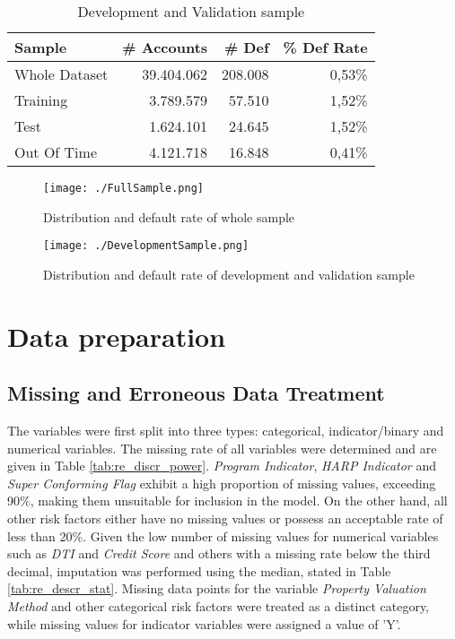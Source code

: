 \begin{table}[H]
\centering
\begin{tabular}{lrrr} \toprule       
\textbf{Sample} & \textbf{\# Accounts} & \textbf{\# Def} & \textbf{\% Def Rate} \\\midrule
Whole Dataset   & 39.404.062           & 208.008         & 0,53\%               \\
Training        & 3.789.579            & 57.510          & 1,52\%               \\
Test            & 1.624.101            & 24.645          & 1,52\%               \\
Out Of Time     & 4.121.718            & 16.848          & 0,41\%               \\\bottomrule
\end{tabular}
\caption{Development and Validation sample}
\label{tab:re_devoofsample}
\end{table}

\begin{figure}[H]
	\centering
	\texttt{[image: ./FullSample.png]}
    \caption{Distribution and default rate of whole sample}
    \label{fig:re_wholesample}
\end{figure}
\begin{figure}[H]
	\centering
	\texttt{[image: ./DevelopmentSample.png]}
    \caption{Distribution and default rate of development and validation sample}
    \label{fig:re_devsample}
\end{figure}

\section{Data preparation}
\subsection{Missing and Erroneous Data Treatment}
The variables were first split into three types: categorical, indicator/binary and numerical variables. The missing rate of all variables were determined and are given in Table \ref{tab:re_discr_power}. \emph{Program Indicator}, \emph{HARP Indicator} and \emph{Super Conforming Flag} exhibit a high proportion of missing values, exceeding 90\%, making them unsuitable for inclusion in the model. On the other hand, all other risk factors either have no missing values or possess an acceptable rate of less than 20\%. Given the low number of missing values for numerical variables such as \emph{DTI} and \emph{Credit Score} and others with a missing rate below the third decimal, imputation was performed using the median, stated in Table \ref{tab:re_descr_stat}. Missing data points for the variable \emph{Property Valuation Method} and other categorical risk factors were treated as a distinct category, while missing values for indicator variables were assigned a value of 'Y'.

